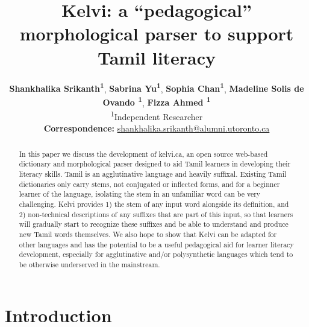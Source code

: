 \documentclass[11pt]{article}
\title{Kelvi: a “pedagogical” morphological parser to support Tamil literacy}
\author{
 \textbf{Shankhalika Srikanth\textsuperscript{1}},
 \textbf{Sabrina Yu\textsuperscript{1}},
 \textbf{Sophia Chan\textsuperscript{1}},
 \textbf{Madeline Solis de Ovando \textsuperscript{1}},
 \textbf{Fizza Ahmed \textsuperscript{1}}
 \\
 \textsuperscript{1}Independent Researcher
 \\
 \small{
   \textbf{Correspondence:} \href{mailto:shankhalika.srikanth@alumni.utoronto.ca}{shankhalika.srikanth@alumni.utoronto.ca}
 }
}
\begin{document}
\maketitle
\begin{abstract}
In this paper we discuss the development of kelvi.ca, an open source web-based dictionary and morphological parser designed to aid Tamil learners in developing their literacy skills. 
Tamil is an agglutinative language and heavily suffixal. Existing Tamil dictionaries only carry stems, not conjugated or inflected forms, and for a beginner learner of the language, isolating the stem in an unfamiliar word can be very challenging. 
Kelvi provides 1) the stem of any input word alongside its definition, and 2) non-technical descriptions of any suffixes that are part of this input, so that learners will gradually start to recognize these suffixes and be able to understand and produce new Tamil words themselves. 
We also hope to show that Kelvi can be adapted for other languages and has the potential to be a useful pedagogical aid for learner literacy development, especially for agglutinative and/or polysynthetic languages which tend to be otherwise underserved in the mainstream.
\end{abstract}

\section{Introduction}
\end{document}
